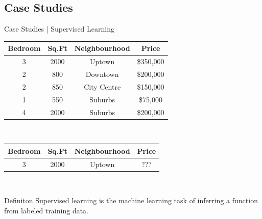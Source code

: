 \documentclass[10pt]{beamer}
\begin{document}
		\subsection{Case Studies}
			\begin{frame}{Case Studies | Supervised Learning}
				\begin{center}
					\begin{tabular}{|c|c|c|c|}							\hline 
						\bfseries{Bedroom} & \bfseries{Sq.Ft} & \bfseries{Neighbourhood} & \bfseries{Price}\\ 	\hline
						3       & 2000  & Uptown        & \$350,000 \\ 	\hline 
						2       & 800   & Downtown      & \$200,000 \\ 	\hline 
						2       & 850   & City Centre   & \$150,000 \\ 	\hline 
						1       & 550   & Suburbs       & \$75,000 \\	\hline 
						4       & 2000  & Suburbs       & \$200,000 \\	\hline 
					\end{tabular}\\
					\bigskip
					\begin{tabular}{|c|c|c|c|}							\hline 
						\bfseries{Bedroom} & \bfseries{Sq.Ft} & \bfseries{Neighbourhood} & \bfseries{Price}\\ 	\hline
						3   	& 2000  & Uptown        & ???\\			\hline 
					\end{tabular} \\
					\bigskip
					\begin{block}{Definiton}
						Supervised learning is the machine learning task of inferring a function from labeled training data.
					\end{block}
				\end{center} 
			\end{frame}
\end{document}
